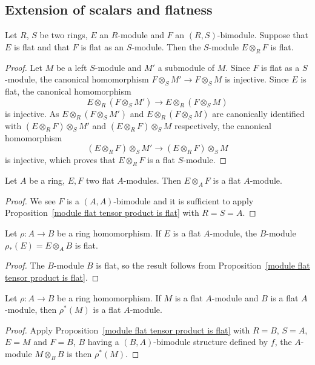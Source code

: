 \subsection{Extension of scalars and flatness}
\begin{proposition}\label{module flat tensor product is flat}
Let $R$, $S$ be two rings, $E$ an $R$-module and $F$ an $(R,S)$-bimodule. Suppose that $E$ is flat and that $F$ is flat as an $S$-module. Then the $S$-module $E\otimes_RF$ is flat.
\end{proposition}
\begin{proof}
Let $M$ be a left $S$-module and $M'$ a submodule of $M$. Since $F$ is flat as a $S$-module, the canonical homomorphism $F\otimes_SM'\to F\otimes_SM$ is injective. Since $E$ is flat, the canonical homomorphism
\[E\otimes_R(F\otimes_SM')\to E\otimes_R(F\otimes_SM)\]
is injective. As $E\otimes_R(F\otimes_SM')$ and $E\otimes_R(F\otimes_SM)$ are canonically identified with $(E\otimes_RF)\otimes_SM'$ and $(E\otimes_RF)\otimes_SM$ respectively, the canonical homomorphism
\[(E\otimes_RF)\otimes_SM'\to(E\otimes_RF)\otimes_SM\]
is injective, which proves that $E\otimes_RF$ is a flat $S$-module.
\end{proof}
\begin{corollary}\label{module flat tensor is flat}
Let $A$ be a ring, $E,F$ two flat $A$-modules. Then $E\otimes_AF$ is a flat $A$-module.
\end{corollary}
\begin{proof}
We see $F$ is a $(A,A)$-bimodule and it is sufficient to apply Proposition~\ref{module flat tensor product is flat} with $R=S=A$.
\end{proof}
\begin{corollary}\label{module flat extension is flat}
Let $\rho:A\to B$ be a ring homomorphism. If $E$ is a flat $A$-module, the $B$-module $\rho_*(E)=E\otimes_AB$ is flat.
\end{corollary}
\begin{proof}
The $B$-module $B$ is flat, so the result follows from Proposition~\ref{module flat tensor product is flat}.
\end{proof}
\begin{corollary}\label{module flat restriction is flat}
Let $\rho:A\to B$ be a ring homomorphism. If $M$ is a flat $A$-module and $B$ is a flat $A$-module, then $\rho^*(M)$ is a flat $A$-module.
\end{corollary}
\begin{proof}
Apply Proposition~\ref{module flat tensor product is flat} with $R=B$, $S=A$, $E=M$ and $F=B$, $B$ having a $(B,A)$-bimodule structure defined by $f$, the $A$-module $M\otimes_BB$ is then $\rho^*(M)$.
\end{proof}
